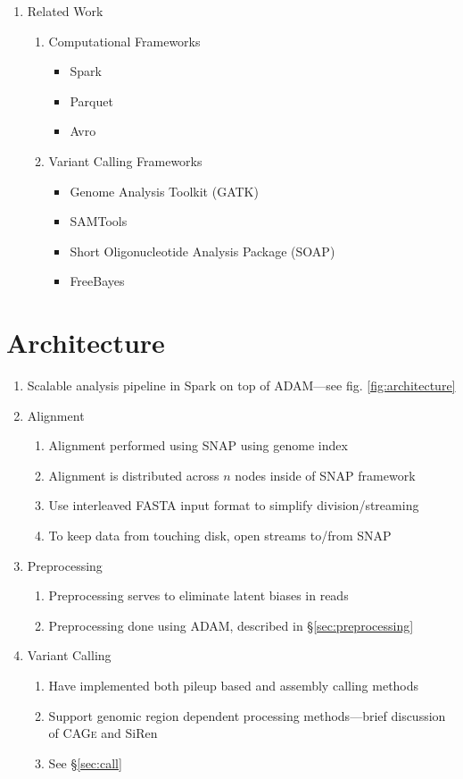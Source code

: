 \documentclass[11pt]{article}
\begin{document}
\begin{enumerate}
\item Related Work
\begin{enumerate}
\item Computational Frameworks
\begin{itemize}
\item Spark
\item Parquet
\item Avro
\end{itemize}
\item Variant Calling Frameworks
\begin{itemize}
\item Genome Analysis Toolkit (GATK)
\item SAMTools
\item Short Oligonucleotide Analysis Package (SOAP)
\item FreeBayes
\end{itemize}
\end{enumerate}
\end{enumerate}

\section{Architecture}

\begin{enumerate}
\item Scalable analysis pipeline in Spark on top of ADAM---see fig. \ref{fig:architecture}
\item Alignment
\begin{enumerate}
\item Alignment performed using SNAP using genome index
\item Alignment is distributed across $n$ nodes inside of SNAP framework
\item Use interleaved FASTA input format to simplify division/streaming
\item To keep data from touching disk, open streams to/from SNAP
\end{enumerate}
\item Preprocessing
\begin{enumerate}
\item Preprocessing serves to eliminate latent biases in reads
\item Preprocessing done using ADAM, described in \S\ref{sec:preprocessing}
\end{enumerate}
\item Variant Calling
\begin{enumerate}
\item Have implemented both pileup based and assembly calling methods
\item Support genomic region dependent processing methods---brief discussion of \textsc{CAGe} and SiRen
\item See \S\ref{sec:call}
\end{enumerate}
\end{enumerate}
\end{document}
